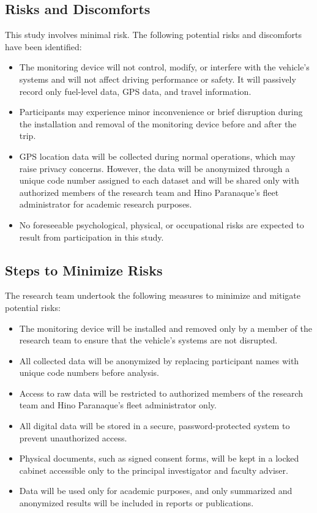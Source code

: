 \subsection{Risks and Discomforts}

This study involves minimal risk. The following potential risks and discomforts have been identified:

\begin{itemize}
    \item The monitoring device will not control, modify, or interfere with the vehicle's systems and will not affect driving performance or safety. It will passively record only fuel-level data, GPS data, and travel information.
    \item Participants may experience minor inconvenience or brief disruption during the installation and removal of the monitoring device before and after the trip.
    \item GPS location data will be collected during normal operations, which may raise privacy concerns. However, the data will be anonymized through a unique code number assigned to each dataset and will be shared only with authorized members of the research team and Hino Paranaque's fleet administrator for academic research purposes.
    \item No foreseeable psychological, physical, or occupational risks are expected to result from participation in this study.
\end{itemize}

\subsection{Steps to Minimize Risks}

The research team undertook the following measures to minimize and mitigate potential risks:

\begin{itemize}
    \item The monitoring device will be installed and removed only by a member of the research team to ensure that the vehicle's systems are not disrupted.
    \item All collected data will be anonymized by replacing participant names with unique code numbers before analysis.
    \item Access to raw data will be restricted to authorized members of the research team and Hino Paranaque's fleet administrator only.
    \item All digital data will be stored in a secure, password-protected system to prevent unauthorized access.
    \item Physical documents, such as signed consent forms, will be kept in a locked cabinet accessible only to the principal investigator and faculty adviser.
    \item Data will be used only for academic purposes, and only summarized and anonymized results will be included in reports or publications.
\end{itemize}

